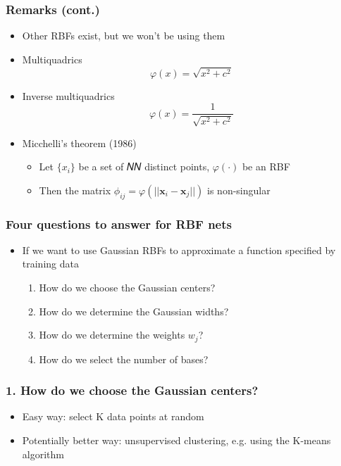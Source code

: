 \documentclass[12pt,notes,mathserif]{beamer}
\begin{document}
\begin{frame}[c]
	\frametitle{Remarks (cont.)}
	\begin{itemize}
		\item Other RBFs exist, but we won’t be using them
		\item Multiquadrics
		      \[
			      \varphi(x)=\sqrt{x^2+c^2}
		      \]
		\item Inverse multiquadrics
		      \[
			      \varphi(x)=\frac{1}{\sqrt{x^2+c^2}}
		      \]
		\item Micchelli's theorem (1986)
		      \begin{itemize}
			      \item Let $\{x_i\}$ be a set of 𝑁𝑁 distinct points, $\varphi(\cdot)$ be an RBF
			      \item Then the matrix $\phi_{ij}=\varphi(||\mathbf{x}_i-\mathbf{x}_j||)$ is non-singular
		      \end{itemize}
	\end{itemize}
\end{frame}

\begin{frame}[c]
	\frametitle{Four questions to answer for RBF nets}
	\begin{itemize}
		\item If we want to use Gaussian RBFs to approximate a function specified by training data
		      \begin{enumerate}
			      \item How do we choose the Gaussian centers?
			      \item How do we determine the Gaussian widths?
			      \item How do we determine the weights $w_j$?
			      \item How do we select the number of bases?
		      \end{enumerate}
	\end{itemize}
\end{frame}


\begin{frame}[c]
	\frametitle{1. How do we choose the Gaussian centers?}
	\begin{itemize}
		\item Easy way: select K data points at random
		\item Potentially better way: unsupervised clustering, e.g. using the K-means algorithm
	\end{itemize}
\end{frame}
\end{document}
